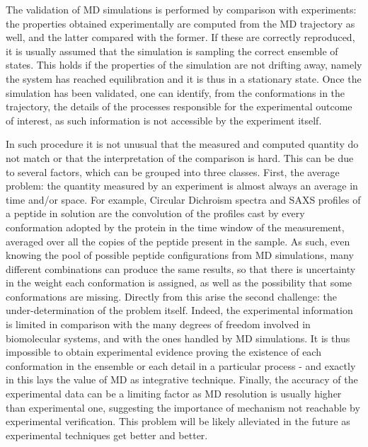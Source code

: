 The validation of MD simulations is performed by comparison with experiments: the properties obtained experimentally are computed from the MD trajectory as well, and the latter compared with the former. If these are correctly reproduced, it is usually assumed that the simulation is sampling the correct ensemble of states. This holds if the properties of the simulation are not drifting away, namely the system has reached equilibration and it is thus in a stationary state.
%
Once the simulation has been validated, one can identify, from the conformations in the trajectory, the details of the processes responsible for the experimental outcome of interest, as such information is not accessible by the experiment itself.

In such procedure it is not unusual that the measured and computed quantity do not match or that the interpretation of the comparison is hard. This can be due to several factors, which can be grouped into three classes.
%
First, the average problem: the quantity measured by an experiment is almost always an average in time and/or space. For example, Circular Dichroism spectra and SAXS profiles of a peptide in solution are the convolution of the profiles cast by every conformation adopted by the protein in the time window of the measurement, averaged over all the copies of the peptide present in the sample. As such, even knowing the pool of possible peptide configurations from MD simulations, many different combinations can produce the same results, so that there is uncertainty in the weight each conformation is assigned, as well as the possibility that some conformations are missing.
%
Directly from this arise the second challenge: the under-determination of the problem itself. Indeed, the experimental information is limited in comparison with the many degrees of freedom involved in biomolecular systems, and with the ones handled by MD simulations. It is thus impossible to obtain experimental evidence proving the existence of each conformation in the ensemble or each detail in a particular process - and exactly in this lays the value of MD as integrative technique.
%
Finally, the accuracy of the experimental data can be a limiting factor as MD resolution is usually higher than experimental one, suggesting the importance of mechanism not reachable by experimental verification. This problem will be likely alleviated in the future as experimental techniques get better and better.

